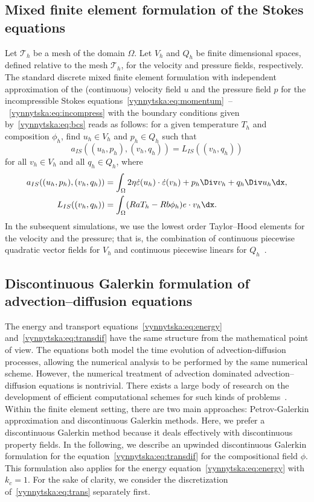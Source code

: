 \subsection{Mixed finite element formulation of the Stokes equations}

Let $\mathcal{T}_h$ be a mesh of the domain $\Omega$. Let $V_h$ and
$Q_h$ be finite dimensional spaces, defined relative to the mesh
$\mathcal{T}_h$, for the velocity and pressure fields,
respectively. The standard discrete mixed finite element formulation
with independent approximation of the (continuous) velocity field $u$
and the pressure field $p$ for the incompressible Stokes
equations~\eqref{vynnytska:eq:momentum}~--~\eqref{vynnytska:eq:incompress}
with the boundary conditions given by~\eqref{vynnytska:eq:bcs} reads
as follows: for a given temperature $T_h$ and composition $\phi_h$,
find $u_h \in V_h$ and $p_h \in Q_h$ such that
\begin{equation}
  \label{vynnytska:eq:mixed}
  a_{IS} ( (u_h, p_h), (v_h, q_h) ) = L_{IS} ( (v_h, q_h) )
\end{equation}
for all $v_h \in V_h$ and all $q_h \in Q_h$, where
\begin{align}
  a_{IS} ( (u_h, p_h), (v_h, q_h) )
  & = \int_{\Omega} 2 \eta \dot {\varepsilon}(u_h)  \cdot \dot {\varepsilon}(v_h)
  + p_h \Div v_h + q_h \Div u_h \dx,
\\
  L_{IS} ( (v_h, q_h) ) &=
  \int_{\Omega} ( Ra T_h - Rb \phi_{h} ) e \cdot v_h  \dx.
\end{align}
In the subsequent simulations, we use the lowest order Taylor--Hood
elements for the velocity and the pressure; that is, the combination
of continuous piecewise quadratic vector fields for $V_h$ and
continuous piecewise linears for $Q_h$~\citep{TaylorHood1973}.

\subsection{Discontinuous Galerkin formulation of advection--diffusion equations}

The energy and transport equations~\eqref{vynnytska:eq:energy}
and~\eqref{vynnytska:eq:transdif} have the same structure from the
mathematical point of view. The equations both model the time
evolution of advection-diffusion processes, allowing the numerical
analysis to be performed by the same numerical scheme. However, the
numerical treatment of advection dominated advection--diffusion
equations is nontrivial. There exists a large body of research on the
development of efficient computational schemes for such kinds of
problems~\citep{Lin2006, ZienkiewiczTaylor2000}.  Within the finite
element setting, there are two main approaches: Petrov-Galerkin
approximation and discontinuous Galerkin methods. Here, we prefer a
discontinuous Galerkin method because it deals effectively with
discontinuous property fields. In the following, we describe an
upwinded discontinuous Galerkin formulation for the
equation~\eqref{vynnytska:eq:transdif} for the compositional field
$\phi$. This formulation also applies for the energy
equation~\eqref{vynnytska:eq:energy} with $k_c = 1$. For the sake of
clarity, we consider the discretization of~\eqref{vynnytska:eq:trans}
separately first.

